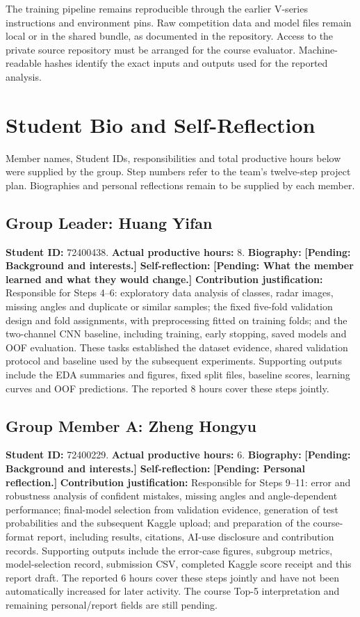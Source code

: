 \documentclass[journal]{IEEEtran}
\newcommand{\pending}[1]{\textbf{[Pending: #1]}}
\begin{document}
The training pipeline remains reproducible through the earlier V-series instructions and environment pins. Raw competition data and model files remain local or in the shared bundle, as documented in the repository. Access to the private source repository must be arranged for the course evaluator. Machine-readable hashes identify the exact inputs and outputs used for the reported analysis.

\section{Student Bio and Self-Reflection}
Member names, Student IDs, responsibilities and total productive hours below were supplied by the group. Step numbers refer to the team's twelve-step project plan. Biographies and personal reflections remain to be supplied by each member.
\subsection{Group Leader: Huang Yifan}
\textbf{Student ID:} 72400438. \textbf{Actual productive hours:} 8.
\textbf{Biography:} \pending{Background and interests.}
\textbf{Self-reflection:} \pending{What the member learned and what they would change.}
\textbf{Contribution justification:} Responsible for Steps 4--6: exploratory data analysis of classes, radar images, missing angles and duplicate or similar samples; the fixed five-fold validation design and fold assignments, with preprocessing fitted on training folds; and the two-channel CNN baseline, including training, early stopping, saved models and OOF evaluation. These tasks established the dataset evidence, shared validation protocol and baseline used by the subsequent experiments. Supporting outputs include the EDA summaries and figures, fixed split files, baseline scores, learning curves and OOF predictions. The reported 8 hours cover these steps jointly.
\subsection{Group Member A: Zheng Hongyu}
\textbf{Student ID:} 72400229. \textbf{Actual productive hours:} 6.
\textbf{Biography:} \pending{Background and interests.}
\textbf{Self-reflection:} \pending{Personal reflection.}
\textbf{Contribution justification:} Responsible for Steps 9--11: error and robustness analysis of confident mistakes, missing angles and angle-dependent performance; final-model selection from validation evidence, generation of test probabilities and the subsequent Kaggle upload; and preparation of the course-format report, including results, citations, AI-use disclosure and contribution records. Supporting outputs include the error-case figures, subgroup metrics, model-selection record, submission CSV, completed Kaggle score receipt and this report draft. The reported 6 hours cover these steps jointly and have not been automatically increased for later activity. The course Top-5 interpretation and remaining personal/report fields are still pending.
\end{document}
